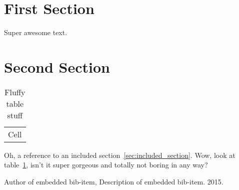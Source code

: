 \documentclass{article}
\begin{document}
\section{First Section} %
\label{sec:first_section}

Super awesome text.


\section{Second Section} %
\label{sec:second_section}


\begin{table}[htbp]
    \caption{Fluffy table stuff}
    \begin{center}
        \begin{tabular}{c}
            Cell
        \end{tabular}
    \end{center}
    \label{table:a_table_label}
\end{table}



Oh, a reference to an included section~\ref{sec:included_section}. Wow, look at
table~\ref{table:a_table_label}, isn't it super gorgeous and totally not boring in
any way?

\begin{thebibliography}{9}
      Author of embedded bib-item,
      Description of embedded bib-item.
      2015.
\end{thebibliography}
\end{document}
